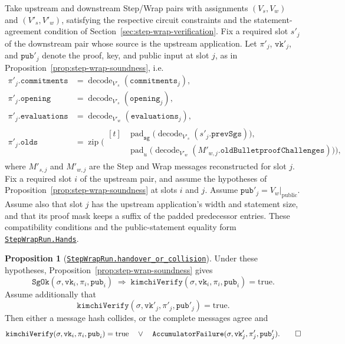\documentclass[11pt,a4paper]{article}
\newcommand{\inlinecode}[1]{\mbox{\texttt{#1}}}
\newcommand{\restrict}[2]{\left.#1\right\rvert_{#2}}
\theoremstyle{definition}
\theoremstyle{insetstatement}
\newtheorem{propositiontext}[example]{Proposition}
\newenvironment{statementblock}
  {\begin{list}{}{%
    \setlength{\leftmargin}{0pt}%
    \setlength{\rightmargin}{0pt}%
    \setlength{\labelwidth}{0pt}%
    \setlength{\labelsep}{0pt}%
    \setlength{\itemindent}{0pt}%
    \setlength{\listparindent}{0pt}%
    \setlength{\topsep}{.7\baselineskip plus 2pt minus 1pt}%
    \setlength{\partopsep}{0pt}%
    \setlength{\parsep}{0pt}%
    \setlength{\itemsep}{0pt}}%
    \item\relax}
  {\end{list}}
\newenvironment{proposition}[1][]
  {\begin{statementblock}\begin{propositiontext}[{#1}]\pushQED{\qed}}
  {\popQED\end{propositiontext}\end{statementblock}}
\begin{document}
Take upstream and downstream Step/Wrap pairs with assignments $(V_s,V_w)$ and
$(V'_s,V'_w)$, satisfying the respective circuit constraints and the
statement-agreement condition of
Section~\ref{sec:step-wrap-verification}. Fix a required slot $s'_j$ of the
downstream pair whose source is the upstream application. Let $\pi'_j$,
$\mathtt{vk}'_j$, and $\mathtt{pub}'_j$ denote the proof, key, and public
input at slot $j$, as in Proposition~\ref{prop:step-wrap-soundness}, i.e.
\[
  \begin{aligned}
    \pi'_j.\mathtt{commitments}
      &= \operatorname{decode}_{V'_s}(\mathtt{commitments}_j),\\
    \pi'_j.\mathtt{opening}
      &= \operatorname{decode}_{V'_s}(\mathtt{opening}_j),\\
    \pi'_j.\mathtt{evaluations}
      &= \operatorname{decode}_{V'_w}(\mathtt{evaluations}_j),\\
    \pi'_j.\mathtt{olds}
      &= \operatorname{zip}\bigl(
        \begin{aligned}[t]
          &\operatorname{pad}_{\mathtt{sg}}\bigl(
            \operatorname{decode}_{V'_s}(s'_j.\mathtt{prevSgs})\bigr),\\
          &\operatorname{pad}_{u}\bigl(
            \operatorname{decode}_{V'_w}(M'_{w,j}.\mathtt{oldBulletproofChallenges})\bigr)\bigr),
        \end{aligned}
  \end{aligned}
\]
where $M'_{s,j}$ and $M'_{w,j}$ are the Step and Wrap messages
reconstructed for slot $j$.
Fix a required slot $i$ of the upstream pair, and assume the hypotheses of
Proposition~\ref{prop:step-wrap-soundness} at slots $i$ and $j$.
Assume \mbox{$\mathtt{pub}'_j=\restrict{V_w}{\mathrm{public}}$}.
Assume also that slot $j$ has the upstream application's width and statement
size, and that its proof mask keeps a suffix of the padded predecessor
entries. These compatibility conditions and the public-statement equality
form \href{https://github.com/l-adic/snarky/blob/main/formal/pickles/Pickles/Soundness/Handover.lean\#L847}{\inlinecode{StepWrapRun.Hands}}.

\begin{samepage}
\begin{proposition}[\href{https://github.com/l-adic/snarky/blob/main/formal/pickles/Pickles/Soundness/Handover.lean\#L982}{\inlinecode{StepWrapRun.handover\_or\_collision}}]
\label{prop:wrap-handover}
Under these hypotheses, Proposition~\ref{prop:step-wrap-soundness} gives
\[
  \mathtt{SgOk}(\sigma,\mathtt{vk}_i,\pi_i,\mathtt{pub}_i)
  \;\Longrightarrow\;
  \mathtt{kimchiVerify}(\sigma,\mathtt{vk}_i,\pi_i,\mathtt{pub}_i)
    =\mathrm{true}.
\]
Assume additionally that
\[
  \mathtt{kimchiVerify}(\sigma,\mathtt{vk}'_j,\pi'_j,\mathtt{pub}'_j)
    =\mathrm{true}.
\]
Then either a message hash collides, or the complete messages agree and
\[
  \mathtt{kimchiVerify}(\sigma,\mathtt{vk}_i,\pi_i,\mathtt{pub}_i)
    =\mathrm{true}
  \quad\lor\quad
  \mathtt{AccumulatorFailure}(\sigma,\mathtt{vk}'_j,\pi'_j,\mathtt{pub}'_j).\qedhere
\]
\end{proposition}
\end{samepage}
\end{document}
